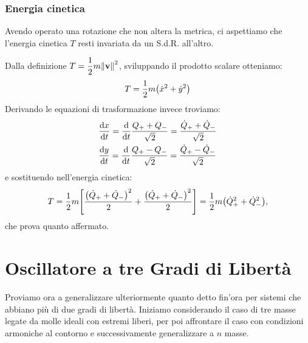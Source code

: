         \subsubsection{Energia cinetica}
            Avendo operato una rotazione che non altera la metrica, ci aspettiamo che l'energia cinetica $T$ resti invariata da un S.d.R. all'altro.
            \par Dalla definizione $\displaystyle T=\frac{1}{2}m\norm{\vb{v}}^2$, sviluppando il prodotto scalare otteniamo: $$T=\frac{1}{2}m\qty(\dot{x}^2+\dot{y}^2)$$ Derivando le equazioni di trasformazione invece troviamo:
            \begin{align*}
                &\dv{x}{t}=\dv{t}\frac{Q_++Q_-}{\sqrt{2}}=\frac{\dot{Q}_++\dot{Q}_-}{\sqrt{2}}\\
                &\dv{y}{t}=\dv{t}\frac{Q_+-Q_-}{\sqrt{2}}=\frac{\dot{Q}_+-\dot{Q}_-}{\sqrt{2}}
            \end{align*}
            e sostituendo nell'energia cinetica:
                $$T=\frac{1}{2}m\qty[\frac{\qty(\dot{Q}_++\dot{Q}_-)^2}{2}+\frac{\qty(\dot{Q}_++\dot{Q}_-)^2}{2}]=\frac{1}{2}m\qty(\dot{Q}_+^2+\dot{Q}_-^2),$$
            che prova quanto affermato.
\section{Oscillatore a tre Gradi di Libert\`a}
    Proviamo ora a generalizzare ulteriormente quanto detto fin'ora per sistemi che abbiano pi\`u di due gradi di libert\`a. Iniziamo considerando il caso di tre masse legate da molle ideali con estremi liberi, per poi affrontare il caso con condizioni armoniche al contorno e successivamente generalizzare a $n$ masse.
